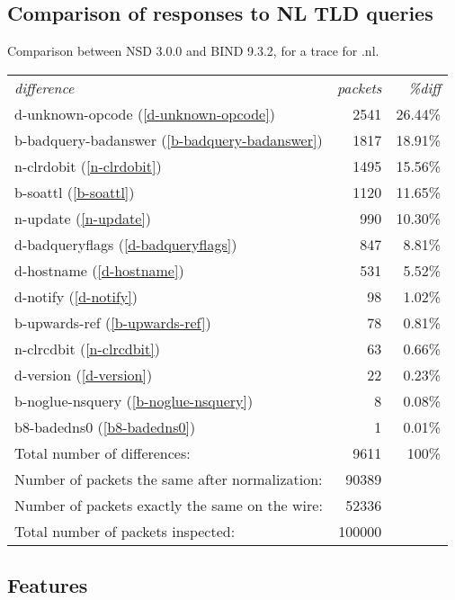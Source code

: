 \documentclass[twoside,titlepage,english]{nlnetlabs}
\begin{document}
\subsection{Comparison of responses to NL TLD queries}
\label{nl_b932nsd3}

Comparison between NSD 3.0.0 and BIND 9.3.2, for a trace for .nl.

\begin{tabular}{lrr}
{\em difference}                        & {\em packets} & {\em \%diff} \\
d-unknown-opcode (\ref{d-unknown-opcode})               &     2541 & 26.44\% \\
b-badquery-badanswer (\ref{b-badquery-badanswer})               &     1817 & 18.91\% \\
n-clrdobit (\ref{n-clrdobit})           &     1495 & 15.56\% \\
b-soattl (\ref{b-soattl})               &     1120 & 11.65\% \\
n-update (\ref{n-update})               &      990 & 10.30\% \\
d-badqueryflags (\ref{d-badqueryflags})         &      847 & 8.81\% \\
d-hostname (\ref{d-hostname})           &      531 & 5.52\% \\
d-notify (\ref{d-notify})               &       98 & 1.02\% \\
b-upwards-ref (\ref{b-upwards-ref})             &       78 & 0.81\% \\
n-clrcdbit (\ref{n-clrcdbit})           &       63 & 0.66\% \\
d-version (\ref{d-version})             &       22 & 0.23\% \\
b-noglue-nsquery (\ref{b-noglue-nsquery})               &        8 & 0.08\% \\
b8-badedns0 (\ref{b8-badedns0})         &        1 & 0.01\% \\
Total number of differences: & 9611 & 100\% \\
Number of packets the same after normalization: & 90389 \\
Number of packets exactly the same on the wire: & 52336 \\
Total number of packets inspected: & 100000 \\
\end{tabular}

\subsection{Features}
\label{sec:features}
\end{document}
